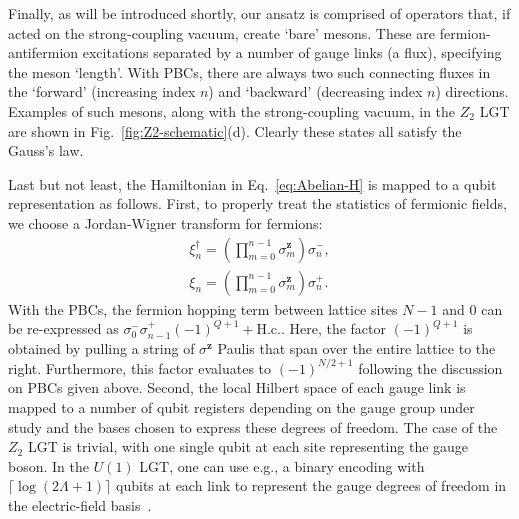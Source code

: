 \documentclass[a4paper,onecolumn,11pt,accepted=2024-10-11]{quantumarticle}
\begin{document}
Finally, as will be introduced shortly, our ansatz is comprised of operators that, if acted on the strong-coupling vacuum, create `bare' mesons. These are fermion-antifermion excitations separated by a number of gauge links (a flux), specifying the meson `length'. With PBCs, there are always two such connecting fluxes in the `forward' (increasing index $n$) and `backward' (decreasing index $n$) directions. Examples of such mesons, along with the strong-coupling vacuum, in the $Z_2$ LGT are shown in Fig.~\ref{fig:Z2-schematic}(d). Clearly these states all satisfy the Gauss's law.

Last but not least, the Hamiltonian in Eq.~\eqref{eq:Abelian-H} is mapped to a qubit representation as follows. First, to properly treat the statistics of fermionic fields, we choose a Jordan-Wigner transform for fermions:
%
\begin{subequations}
\label{eq:jw}
\begin{align}
        \xi_n^\dagger = \left(\displaystyle \prod_{m=0}^{n-1}{\sigma^{\textbf{z}}_m}\right) \sigma_n^{-}, \label{eq:jwa}\\
        \xi_n = \left(\displaystyle \prod_{m=0}^{n-1}{\sigma^{\textbf{z}}_m}\right) \sigma_n^+.
    \label{eq:jwb}
\end{align}
\end{subequations}
%
With the PBCs, the fermion hopping term between lattice sites $N-1$ and 0 can be re-expressed as $ \sigma^-_{0}\sigma^+_{n-1} (-1)^{Q+1}+ \text{H.c.}$.
Here, the factor $(-1)^{Q+1}$ is obtained by pulling a string of ${\sigma^{\textbf{z}}}$ Paulis that span over the entire lattice to the right.
Furthermore, this factor evaluates to $(-1)^{N/2+1}$ following the discussion on PBCs given above.
%
Second, the local Hilbert space of each gauge link is mapped to a number of qubit registers depending on the gauge group under study and the bases chosen to express these degrees of freedom. The case of the $Z_2$ LGT is trivial, with one single qubit at each site representing the gauge boson. In the $U(1)$ LGT, one can use e.g., a binary encoding with $\lceil\log(2\Lambda+1)\rceil$ qubits at each link to represent the gauge degrees of freedom in the electric-field basis~\cite{Shaw:2020udc}.
\end{document}
